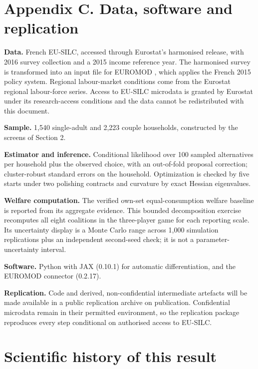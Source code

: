\documentclass[11pt,a4paper]{article}
\begin{document}
\section{Appendix C. Data, software and replication}\label{appendix-c.-data-software-and-replication}

\textbf{Data.} French EU-SILC, accessed through Eurostat's harmonised release, with 2016 survey collection and a 2015 income reference year. The harmonised survey is transformed into an input file for EUROMOD \citep{sutherlandfigari2013}, which applies the French 2015 policy system. Regional labour-market conditions come from the Eurostat regional labour-force series. Access to EU-SILC microdata is granted by Eurostat under its research-access conditions and the data cannot be redistributed with this document.

\textbf{Sample.} 1,540 single-adult and 2,223 couple households, constructed by the screens of Section 2.

\textbf{Estimator and inference.} Conditional likelihood over 100 sampled alternatives per household plus the observed choice, with an out-of-fold proposal correction; cluster-robust standard errors on the household. Optimization is checked by five starts under two polishing contracts and curvature by exact Hessian eigenvalues.

\textbf{Welfare computation.} The verified own-set equal-consumption welfare baseline is reported from its aggregate evidence. This bounded decomposition exercise recomputes all eight coalitions in the three-player game for each reporting scale. Its uncertainty display is a Monte Carlo range across 1,000 simulation replications plus an independent second-seed check; it is not a parameter-uncertainty interval.

\textbf{Software.} Python with JAX (0.10.1) for automatic differentiation, and the EUROMOD connector (0.2.17).

\textbf{Replication.} Code and derived, non-confidential intermediate artefacts will be made available in a public replication archive on publication. Confidential microdata remain in their permitted environment, so the replication package reproduces every step conditional on authorised access to EU-SILC.

\section{Scientific history of this result}\label{scientific-history-of-this-result}
\end{document}
